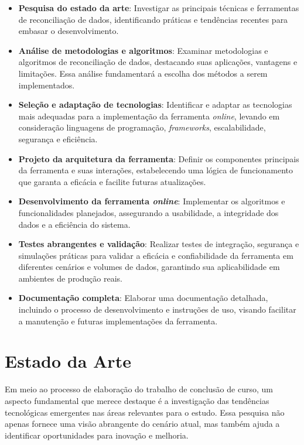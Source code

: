 \begin{itemize}
	\item \textbf{Pesquisa do estado da arte}: Investigar as principais técnicas e ferramentas de reconciliação de dados, identificando práticas e tendências recentes para embasar o desenvolvimento.

	\item \textbf{Análise de metodologias e algoritmos}: Examinar metodologias e algoritmos de reconciliação de dados, destacando suas aplicações, vantagens e limitações. Essa análise fundamentará a escolha dos métodos a serem implementados.

	\item \textbf{Seleção e adaptação de tecnologias}: Identificar e adaptar as tecnologias mais adequadas para a implementação da ferramenta \textit{online}, levando em consideração linguagens de programação, \textit{frameworks}, escalabilidade, segurança e eficiência.

	\item \textbf{Projeto da arquitetura da ferramenta}: Definir os componentes principais da ferramenta e suas interações, estabelecendo uma lógica de funcionamento que garanta a eficácia e facilite futuras atualizações.

	\item \textbf{Desenvolvimento da ferramenta \textit{online}}: Implementar os algoritmos e funcionalidades planejados, assegurando a usabilidade, a integridade dos dados e a eficiência do sistema.

	\item \textbf{Testes abrangentes e validação}: Realizar testes de integração, segurança e simulações práticas para validar a eficácia e confiabilidade da ferramenta em diferentes cenários e volumes de dados, garantindo sua aplicabilidade em ambientes de produção reais.

	\item \textbf{Documentação completa}: Elaborar uma documentação detalhada, incluindo o processo de desenvolvimento e instruções de uso, visando facilitar a manutenção e futuras implementações da ferramenta.
\end{itemize}

\section{Estado da Arte}

Em meio ao processo de elaboração do trabalho de conclusão de curso, um aspecto fundamental que merece destaque é a investigação das tendências tecnológicas emergentes nas áreas relevantes para o estudo. Essa pesquisa não apenas fornece uma visão abrangente do cenário atual, mas também ajuda a identificar oportunidades para inovação e melhoria.

